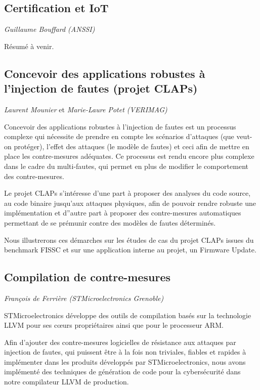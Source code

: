 \documentclass[a4paper,11pt]{article}
\begin{document}
\subsection{Certification et IoT}
\label{sec:orgb170639}
\emph{Guillaume Bouffard (ANSSI)}

Résumé à venir.

\subsection{Concevoir des applications robustes à l'injection de fautes (projet CLAPs)}
\label{sec:orgcbe0334}
\emph{Laurent Mounier} et \emph{Marie-Laure Potet (VERIMAG)}

Concevoir des applications robustes à l'injection de fautes est un
processus complexe qui nécessite de prendre en compte les scénarios
d'attaques (que veut-on protéger), l'effet des attaques (le modèle de
fautes) et ceci afin de mettre en place les contre-mesures
adéquates. Ce processus est rendu encore plus complexe dans le cadre
du multi-fautes, qui permet en plus de modifier le comportement des
contre-mesures.

Le projet CLAPs s'intéresse d'une part à proposer des analyses du code
source, au code binaire jusqu'aux attaques physiques, afin de pouvoir
rendre robuste une implémentation et d''autre part à proposer des
contre-mesures automatiques permettant de se prémunir contre des
modèles de fautes déterminés.

Nous illustrerons ces démarches sur les études de cas du projet CLAPs
issues du benchmark FISSC et sur une application interne au projet, un
Firmware Update.

\subsection{Compilation de contre-mesures}
\label{sec:org3cd223f}
\emph{François de Ferrière (STMicroelectronics Grenoble)}

STMicroelectronics développe des outils de compilation basés sur la
technologie LLVM pour ses cœurs propriétaires ainsi que pour le
processeur ARM.

Afin d'ajouter des contre-mesures logicielles de résistance aux attaques
par injection de fautes, qui puissent être à la fois non triviales,
fiables et rapides à implémenter dans les produits développés par
STMicroelectronics, nous avons implémenté des techniques de génération
de code pour la cybersécurité dans notre compilateur LLVM de production.
\end{document}
